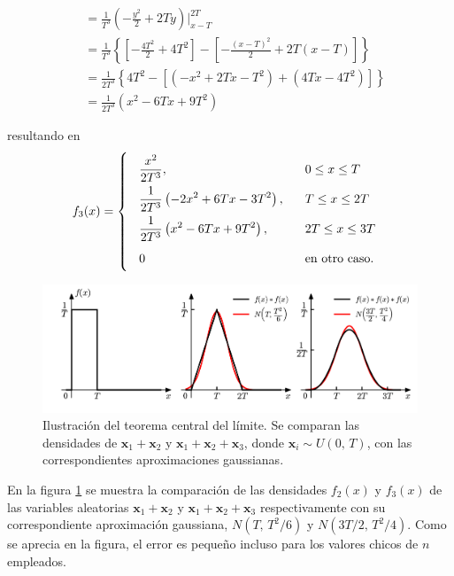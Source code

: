 \documentclass[a4paper]{report}
\newcommand{\x}{\mathbf{x}}
\begin{document}
\begin{itemize}
\begin{itemize}
\begin{align*}
   &=\frac{1}{T^3}\left(-\frac{y^2}{2}+2Ty\right)\bigg|_{x-T}^{2T}\\
   &=\frac{1}{T^3}\left\{\left[-\frac{4T^2}{2}+4T^2\right]-\left[-\frac{(x-T)^2}{2}+2T(x-T)\right]\right\}\\
   &=\frac{1}{2T^3}\left\{4T^2-\left[(-x^2+2Tx-T^2)+(4Tx-4T^2)\right]\right\}\\
   &=\frac{1}{2T^3}\left(x^2-6Tx+9T^2\right)
  \end{align*}
 \end{itemize}
 resultando en
\begin{equation}\label{eq:example_7_15_density_of_sum}
  f_3(x)=
\def\arraystretch{2}\arraycolsep=9pt
 \left\{\begin{array}{ll}
   \displaystyle\frac{x^2}{2T^3}, &  0\leq x\leq T\\
   \displaystyle\frac{1}{2T^3}\left(-2x^2+6Tx-3T^2\right), & T\leq x\leq 2T\\ 
   \displaystyle\frac{1}{2T^3}\left(x^2-6Tx+9T^2\right), & 2T\leq x\leq3T\\ 
   0 & \textrm{en otro caso.}
 \end{array} \right.
\end{equation}
\end{itemize}
\begin{figure}[!htb]
\begin{center}
\includegraphics[width=0.95\columnwidth]{figuras/example_7_15.pdf}
\caption{\label{fig:example_7_15} Ilustración del teorema central del límite. Se comparan las densidades de \(\x_1+\x_2\) y \(\x_1+\x_2+\x_3\), donde \(\x_i\sim U(0,\,T)\), con las correspondientes aproximaciones gaussianas.}
\end{center}
\end{figure}
En la figura \ref{fig:example_7_15} se muestra la comparación de las densidades \(f_2(x)\) y \(f_3(x)\) de las variables aleatorias \(\x_1+\x_2\) y \(\x_1+\x_2+\x_3\) respectivamente con su correspondiente aproximación gaussiana, \(N(T,\,T^2/6)\) y \(N(3T/2,\,T^2/4)\). Como se aprecia en la figura, el error es pequeño incluso para los valores chicos de \(n\) empleados.
\end{document}
